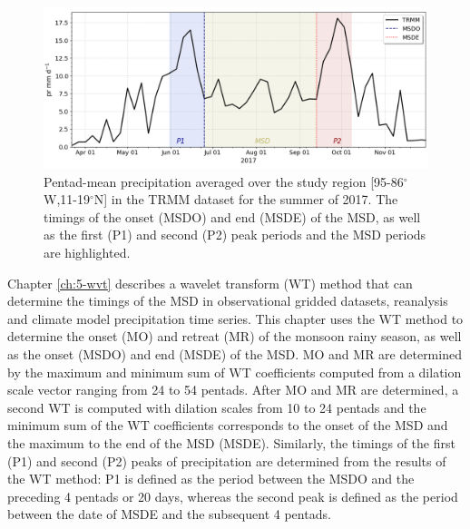  \begin{figure}[b!]
\includegraphics[width=\linewidth]{figures/explain_fig_msd.png}
\caption[Illustration of the use of the wavelet transform method]{Pentad-mean precipitation averaged over the study region [95-86$^\circ$W,11-19$^\circ$N] in the TRMM dataset for the summer of 2017. The timings of the onset (MSDO) and end (MSDE) of the MSD, as well as the first (P1) and second (P2) peak periods and the MSD periods are highlighted. }
\label{fig:explain_msd}
\end{figure}

Chapter \ref{ch:5-wvt} describes a wavelet transform (WT) method that can determine the timings of the MSD in observational gridded datasets, reanalysis and climate model precipitation time series. 
This chapter uses the WT method to determine the onset (MO) and retreat (MR) of the monsoon rainy season, as well as the onset  (MSDO) and end (MSDE) of the MSD. 
 MO and MR are determined by the maximum and minimum sum of WT coefficients computed from a dilation scale vector ranging from 24 to 54 pentads. After MO and MR are determined, a second WT is computed with dilation scales from 10 to 24 pentads and the minimum sum of the WT coefficients corresponds to the onset of the MSD and the maximum to the end of the MSD (MSDE). 
Similarly, the timings of the first (P1) and second (P2) peaks of precipitation are determined from the results of the WT method: P1 is defined as the period between the MSDO and the preceding 4 pentads or 20 days, whereas the second peak is defined as the period between the date of MSDE and the subsequent 4 pentads.

